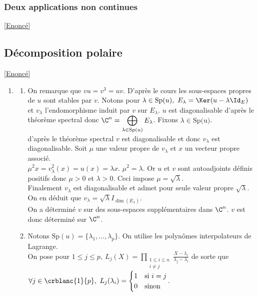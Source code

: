\documentclass[8pt]{book}
\begin{document}
	\subsubsection{Deux applications non continues}
	\label{Deux applications non continues corrigé}
	\textcolor{blue}{\hyperref[Deux applications non continues]{[Enoncé]}}\\
	
	\subsection{Décomposition polaire }
	\label{Décomposition polaire corrigé}
	\textcolor{blue}{\hyperref[Décomposition polaire]{[Enoncé]}}\\
	\begin{enumerate}[leftmargin=*]
		\item \begin{enumerate}[label=\alph*.]
			\item On remarque que $vu=v^3=uv$. D'après le cours les sous-espaces propres de $u$ sont stables par $v$. Notons pour $\lambda\in \text{Sp}(u),\ E_\lambda=\Ker(u-\lambda\Id_E)$ et $v_\lambda$ l'endomorphisme induit par $v$ sur $E_\lambda$. $u$ est diagonalisable d'après le théorème spectral donc $\C^n=\displaystyle\bigoplus_{\lambda\in \text{Sp}(u)}E_\lambda$. Fixons $\lambda\in \text{Sp(u)}$.\\
			d'après le théorème spectral $v$ est diagonalisable et donc $v_\lambda$ est diagonalisable. Soit $\mu$ une valeur propre de $v_\lambda$ et $x$ un vecteur propre associé.\\
			$\mu^2x=v_\lambda^2(x)=u(x)=\lambda x$. $\mu^2=\lambda$. Or $u$ et $v$ sont autoadjoints définis positifs donc $\mu>0$ et $\lambda>0$. Ceci impose $\mu=\sqrt{\lambda}$.\\
			Finalement $v_\lambda$ est diagonalisable et admet pour seule valeur propre $\sqrt{\lambda}$. On en déduit que $v_\lambda=\sqrt{\lambda}I_{\dim(E_\lambda)}$.\\
			On a déterminé $v$ sur des sous-espaces supplémentaires dans $\C^n$. $v$ est donc déterminé sur $\C^n$.
			\item Notons $\text{Sp}(u)=\{\lambda_1,\dots,\lambda_p\}$. On utilise les polynômes interpolateurs de Lagrange.\\
			On pose pour $1\leq j\leq p,\ L_j(X)=\displaystyle\prod_{\substack{1\leq i\leq n\\i\ne j}}\frac{X-\lambda_i}{\lambda_j-\lambda_i}$ de sorte que $\forall j\in \crblanc{1}{p},\ L_j(\lambda_i)=\begin{cases}1&\mbox{si }i=j\\0&\mbox{sinon}\end{cases}$.\\

\end{enumerate}
\end{enumerate}
\end{document}
